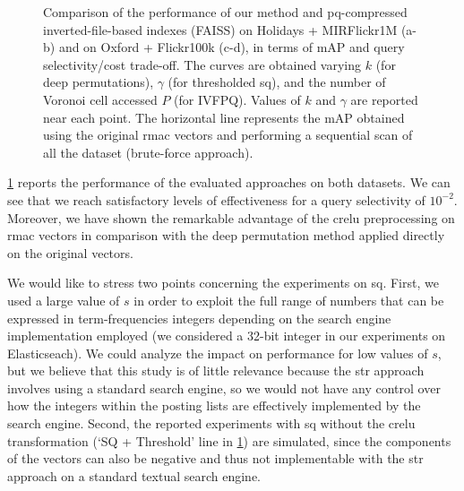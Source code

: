 \begin{figure}
\caption{Comparison of the performance of our method and \gls{pq}-compressed inverted-file-based indexes (FAISS) on Holidays + MIRFlickr1M (a-b) and on Oxford + Flickr100k (c-d), in terms of mAP and query selectivity/cost trade-off.
The curves are obtained varying $k$ (for deep permutations), $\gamma$ (for thresholded \gls{sq}), and the number of Voronoi cell accessed $P$ (for IVFPQ).
Values of $k$ and $\gamma$ are reported near each point.
The horizontal line represents the \gls{mAP} obtained using the original \gls{rmac} vectors and performing a sequential scan of all the dataset (brute-force approach).
}
\label{fig:str:results}
\end{figure}

\ref{fig:str:results} reports the performance of the evaluated approaches on both datasets.
We can see that we reach satisfactory levels of effectiveness for a query selectivity of $10^{-2}$.
Moreover, we have shown the remarkable advantage of the \gls{crelu} preprocessing on \gls{rmac} vectors in comparison with the deep permutation method applied directly on the original vectors.

We would like to stress two points concerning the experiments on \gls{sq}.
First, we used a large value of $s$ in order to exploit the full range of numbers that can be expressed in term-frequencies integers depending on the search engine implementation employed (we considered a 32-bit integer in our experiments on Elasticseach).
We could analyze the impact on performance for low values of $s$, but we believe that this study is of little relevance because the \gls{str} approach involves using a standard search engine, so we would not have any control over how the integers within the posting lists are effectively implemented by the search engine.
Second, the reported experiments with \gls{sq} without the \gls{crelu} transformation (`SQ + Threshold' line in \ref{fig:str:results}) are simulated, since the components of the vectors can also be negative and thus not implementable with the \gls{str} approach on a standard textual search engine.


